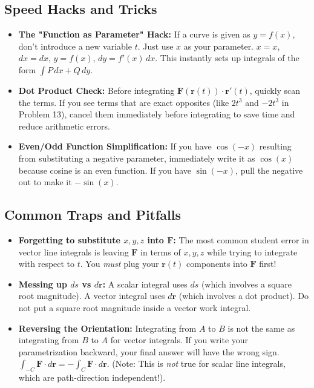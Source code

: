 \documentclass{article}
\begin{document}
\subsection{Speed Hacks and Tricks}
\begin{itemize}
    \item \textbf{The "Function as Parameter" Hack:} If a curve is given as $y = f(x)$, don't introduce a new variable $t$. Just use $x$ as your parameter. $x = x$, $dx = dx$, $y = f(x)$, $dy = f'(x) \, dx$. This instantly sets up integrals of the form $\int P \, dx + Q \, dy$. 
    \item \textbf{Dot Product Check:} Before integrating $\mathbf{F}(\mathbf{r}(t)) \cdot \mathbf{r}'(t)$, quickly scan the terms. If you see terms that are exact opposites (like $2t^3$ and $-2t^3$ in Problem 13), cancel them immediately before integrating to save time and reduce arithmetic errors.
    \item \textbf{Even/Odd Function Simplification:} If you have $\cos(-x)$ resulting from substituting a negative parameter, immediately write it as $\cos(x)$ because cosine is an even function. If you have $\sin(-x)$, pull the negative out to make it $-\sin(x)$.
\end{itemize}

\subsection{Common Traps and Pitfalls}
\begin{itemize}
    \item \textbf{Forgetting to substitute $x, y, z$ into $\mathbf{F}$:} The most common student error in vector line integrals is leaving $\mathbf{F}$ in terms of $x, y, z$ while trying to integrate with respect to $t$. You \textit{must} plug your $\mathbf{r}(t)$ components into $\mathbf{F}$ first!
    \item \textbf{Messing up $ds$ vs $d\mathbf{r}$:} A scalar integral uses $ds$ (which involves a square root magnitude). A vector integral uses $d\mathbf{r}$ (which involves a dot product). Do not put a square root magnitude inside a vector work integral.
    \item \textbf{Reversing the Orientation:} Integrating from $A$ to $B$ is not the same as integrating from $B$ to $A$ for vector integrals. If you write your parametrization backward, your final answer will have the wrong sign. $\int_{-C} \mathbf{F} \cdot d\mathbf{r} = -\int_C \mathbf{F} \cdot d\mathbf{r}$. (Note: This is \textit{not} true for scalar line integrals, which are path-direction independent!).
\end{itemize}
\end{document}
